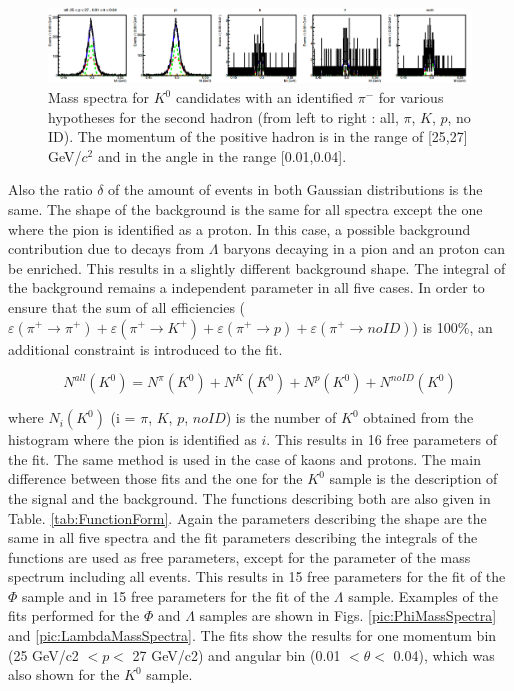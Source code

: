 \begin{figure}[!h]
  \centering
	\includegraphics[scale=0.3]{./gfx/K0MassSpectra.png}
	\caption{Mass spectra for $K^0$ candidates with an identified $\pi^-$ for various hypotheses for the second hadron (from left to right : all, $\pi$, $K$, $p$, no ID). The momentum of the positive hadron is in the range of [25,27] GeV/$c^2$ and in the angle in the range [0.01,0.04].}
	\label{pic:K0MassSpectra}
\end{figure}

Also the ratio $\delta$ of the amount of events in both Gaussian distributions is the same. The shape of the background is the same for all spectra except the one where the pion is identified as a proton. In this case, a possible background contribution due to decays from $\Lambda$ baryons decaying in a pion and an proton can be enriched. This results in  a slightly different background shape. The integral of the background remains a independent parameter in all five cases. In order to ensure that the sum of all efficiencies  ($\varepsilon(\pi^+ \rightarrow \pi^+)  + \varepsilon(\pi^+ \rightarrow K^+ ) + \varepsilon(\pi^+ \rightarrow p ) + \varepsilon(\pi^+ \rightarrow noID)$) is 100\%, an additional constraint is introduced to the fit.

\begin{equation}
  N^{all}(K^0) = N^{\pi}(K^0) + N^{K}(K^0) + N^{p}(K^0) + N^{noID}(K^0)
\end{equation}

where $N_i(K^0)$ (i = $\pi$, $K$, $p$, $noID$) is the number of $K^0$ obtained from the histogram where the pion is identified as $i$. This results in 16 free parameters of the fit. The same method is used in the case of kaons and protons. The main difference between those fits and the one for the $K^0$ sample is the description of the signal and the background. The functions describing both are also given in Table. \ref{tab:FunctionForm}. Again the parameters describing the shape are the same in all five spectra and the fit parameters  describing the integrals of the functions are used as free parameters, except for the parameter of the mass spectrum including all events. This results in 15 free parameters for the fit of the $\Phi$ sample and in 15 free parameters for the fit of the $\Lambda$ sample. Examples of the fits performed for the $\Phi$ and $\Lambda$ samples are shown in Figs. \ref{pic:PhiMassSpectra} and \ref{pic:LambdaMassSpectra}. The fits show the results for one momentum bin (25 GeV/c2 $< p <$ 27 GeV/c2) and angular bin (0.01 $< \theta <$ 0.04), which was also shown for the $K^0$ sample.

